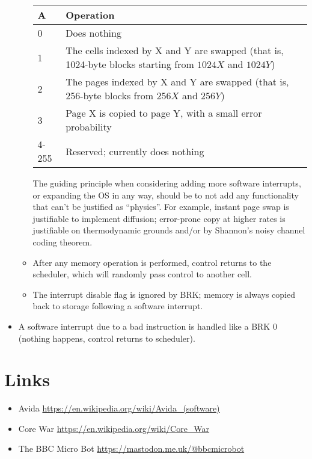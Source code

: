 \documentclass{article}
\begin{document}
\begin{itemize}
\begin{itemize}
      \begin{tabular}{l|p{}}
        A & Operation \\ \hline
        0 & Does nothing \\
    1 & The cells indexed by X and Y are swapped (that is, 1024-byte blocks starting from $1024X$ and $1024Y$) \\
    2 & The pages indexed by X and Y are swapped (that is, 256-byte blocks from $256X$ and $256Y$) \\
    3 & Page X is copied to page Y, with a small error probability \\
    4-255 & Reserved; currently does nothing
      \end{tabular}

      The guiding principle when considering adding more software interrupts,
      or expanding the OS in any way, should be to not add any functionality that can't be justified as ``physics''. For example, instant page swap is justifiable to implement diffusion; error-prone copy at higher rates is justifiable on thermodynamic grounds and/or by Shannon's noisy channel coding theorem.
    \item After any memory operation is performed, control returns to the scheduler, which will randomly pass control to another cell.
    \item The interrupt disable flag is ignored by BRK; memory is always copied back to storage following a software interrupt.
\end{itemize}
\item A software interrupt due to a bad instruction is handled like a BRK 0 (nothing happens, control returns to scheduler).
\end{itemize}

\section{Links}
\begin{itemize}
\item Avida \cite{pmid15107231,pmid37689762} \url{https://en.wikipedia.org/wiki/Avida_(software)}
    \item Core War \url{https://en.wikipedia.org/wiki/Core_War}
    \item The BBC Micro Bot \url{https://mastodon.me.uk/@bbcmicrobot}
\end{itemize}


\end{document}
